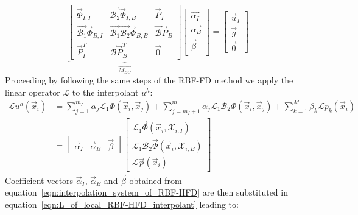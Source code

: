 \begin{equation}
\label{eqn:interpolation_system_of_RBF-HFD}
\underbrace{
\begin{bmatrix}
	\vec{\Phi}_{I,I}  					  &  \vec{\mathcal{B}_2} \vec{\Phi}_{I,B}  					   &  \vec{P}_I  			   \\
	\vec{\mathcal{B}_1} \vec{\Phi}_{B,I}  &  \vec{\mathcal{B}_1} \vec{\mathcal{B}_2} \vec{\Phi}_{B,B}  &  \vec{\mathcal{B}} \vec{P}_B  \\
	\vec{P}_I^T							  &  \vec{\mathcal{B}} \vec{P}_B^T						 	   &  \vec{0}					
\end{bmatrix}}_{\vec{M_{BC}}}
\begin{bmatrix}
	\vec{\alpha_I}  \\
	\vec{\alpha_B}  \\
	\vec{\beta}  	\\
\end{bmatrix} = 
\begin{bmatrix}
	\vec{u}_I  \\
	\vec{g}    \\
	\vec{0}
\end{bmatrix}
\end{equation}
Proceeding by following the same steps of the RBF-FD method we apply the linear operator $\mathcal{L}$ to the interpolant $u^h$:
\begin{equation}
	\label{eqn:L_of_local_RBF-HFD_interpolant}
	\begin{aligned}
		\mathcal{L} u^h(\vec{x}_i) & = \sum_{j=1}^{m_I} \alpha_j \mathcal{L}_1 \Phi(\vec{x}_i, \vec{x}_j) + \sum_{j=m_I+1}^{m} \alpha_j \mathcal{L}_1 \mathcal{B}_2 \Phi(\vec{x}_i, \vec{x}_j) + \sum_{k=1}^{M} \beta_k \mathcal{L} p_k(\vec{x}_i)  \\
		& = \begin{bmatrix}
			\vec{\alpha}_I & \vec{\alpha}_B & \vec{\beta}
		\end{bmatrix}
		\begin{bmatrix}
			\mathcal{L}_1 \vec{\Phi}(\vec{x}_i, \mathcal{X}_{i,I})  			  \\
			\mathcal{L}_1 \mathcal{B}_2 \vec{\Phi}(\vec{x}_i, \mathcal{X}_{i,B})  \\
			\mathcal{L} \vec{p}(\vec{x}_i)
		\end{bmatrix}	
	\end{aligned}
\end{equation}
Coefficient vectors $\vec{\alpha}_I$, $\vec{\alpha}_B$ and $\vec{\beta}$ obtained from equation~\eqref{eqn:interpolation_system_of_RBF-HFD} are then substituted in equation~\eqref{eqn:L_of_local_RBF-HFD_interpolant} leading to:
